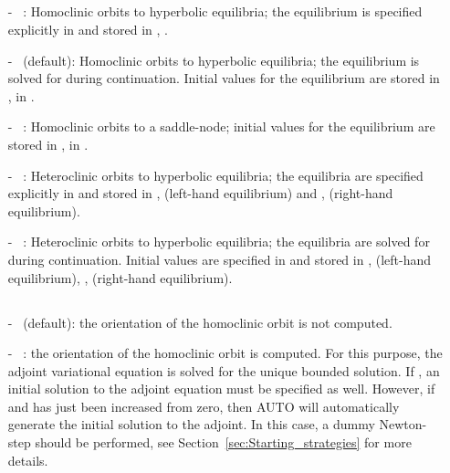 \documentclass[12pt]{report}
\begin{document}
\subsection{}  \label{sec:IEQUIB}
\begin{itemize}
\item[-] ~: 
Homoclinic orbits to hyperbolic equilibria;  
the equilibrium is specified explicitly in  and stored in
, .
\item[-] ~(default): 
Homoclinic orbits to hyperbolic equilibria;  
the equilibrium is solved for during continuation. Initial values for
the equilibrium are stored in ,  in .
\item[-] ~: 
Homoclinic orbits to a saddle-node; initial values for
the equilibrium are stored in ,  in .
\item[-] ~: 
Heteroclinic orbits to hyperbolic equilibria;
the equilibria are specified explicitly in  and stored in
,  
 (left-hand equilibrium) and , 
 (right-hand equilibrium). 
\item[-] ~: 
Heteroclinic orbits to hyperbolic equilibria;
the equilibria are solved for during continuation. Initial values are
specified in  and stored in ,  (left-hand equilibrium), 
,  (right-hand equilibrium).
\end{itemize}

\subsection{}  \label{sec:ITWIST}
\begin{itemize}
\item[-] ~(default): 
the orientation of the homoclinic orbit is not computed.
\item[-] ~: 
the orientation of the homoclinic orbit is computed. For this purpose, the
adjoint variational equation is solved for the unique bounded
solution. If , an initial solution to the adjoint equation
must be specified as well. However, if  and  
has just been increased from zero, then {\cal AUTO} will
automatically generate the initial solution to the adjoint. 
In this case, a dummy Newton-step should be performed, see 
Section~\ref{sec:Starting_strategies} for more details.
\end{itemize}
\end{document}
